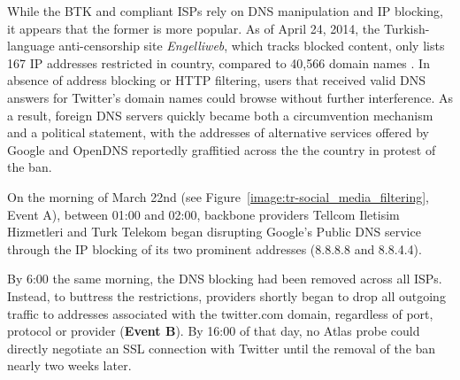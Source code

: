 While the BTK and compliant ISPs rely on DNS manipulation and IP blocking, it
appears that the former is more popular.  As of April 24, 2014, the
Turkish-language anti-censorship site \textit{Engelliweb}, which tracks
blocked content, only lists 167 IP addresses restricted in
country, compared to 40,566 domain names \cite{engelliweb}.
In absence of address blocking or HTTP filtering, users that received valid DNS
answers for Twitter's domain names could browse without further interference.
As a result, foreign DNS servers quickly became both a circumvention mechanism
and a political statement, with the addresses of alternative services offered
by Google and OpenDNS reportedly graffitied across the the country in protest
of the ban.

On the morning of March 22nd (see Figure~\ref{image:tr-social_media_filtering},
Event A), between 01:00 and 02:00, backbone providers Tellcom Iletisim
Hizmetleri and Turk Telekom began disrupting Google's Public DNS service
through the IP blocking of its two prominent addresses (8.8.8.8 and 8.8.4.4).

By 6:00 the same morning, the DNS blocking had been removed across all ISPs.
Instead, to buttress the restrictions, providers shortly began to drop all
outgoing traffic to addresses associated with the twitter.com domain,
regardless of port, protocol or provider (\textbf{Event B}). By 16:00 of that
day, no Atlas probe could directly negotiate an SSL connection with Twitter
until the removal of the ban nearly two weeks later.

